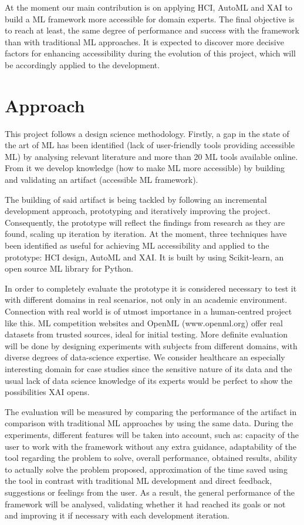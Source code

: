 \documentclass[runningheads]{llncs}
\begin{document}
	At the moment our main contribution is on applying HCI, AutoML and XAI to build a ML framework more
	accessible for domain experts. The final objective is to reach at least, the same degree of performance
	and success with the framework than with traditional ML approaches. It is expected to discover more
	decisive factors for enhancing accessibility during the evolution of this project, which will be
	accordingly applied to the development. 
	
	
	\section{Approach}
	
	This project follows a design science methodology. Firstly, a gap in the state of the art of ML has been
	identified (lack of user-friendly tools providing accessible ML) by analysing relevant literature and
	more than 20 ML tools available online. From it we develop knowledge (how to make ML more accessible)
	by building and validating an artifact (accessible ML framework).
	
	The building of said artifact is being tackled by following an incremental development approach,
	prototyping and iteratively improving the project. Consequently, the prototype will
	reflect the findings from research as they are found, scaling up iteration by iteration. 
	At the moment, three techniques have been identified as useful for achieving ML accessibility and
	applied to the prototype: HCI design, AutoML and XAI. It is built by using Scikit-learn, an open source ML library for Python.
	
	In order to completely evaluate the prototype it is considered necessary to test it with different
	domains in real scenarios, not only in an academic environment. Connection with real world is of
	utmost importance in a human-centred project like this. ML competition websites and OpenML
	(www.openml.org) offer real datasets from trusted sources, ideal for initial testing. More definite
	evaluation will be done by designing experiments with subjects from different domains, with diverse
	degrees of data-science expertise. We consider healthcare an especially interesting domain for case 
	studies since the sensitive nature of its data and the usual lack of data science knowledge of its
	experts would be perfect to show the possibilities XAI opens.
	
	The evaluation will be measured by comparing the performance of the artifact in comparison with
	traditional ML approaches by using the same data.  During the experiments, different features will be
	taken into account, such as: capacity of the user to work with the framework without any extra
	guidance, adaptability of the tool regarding the problem to solve, overall performance, obtained
	results, ability to actually solve the problem proposed, approximation of the time saved using the
	tool in contrast with traditional ML development and direct feedback, suggestions or feelings from
	the user. As a result, the general performance of the framework will be analysed, validating
	whether it had reached its goals or not and improving it if necessary with each development iteration.
	
\end{document}
